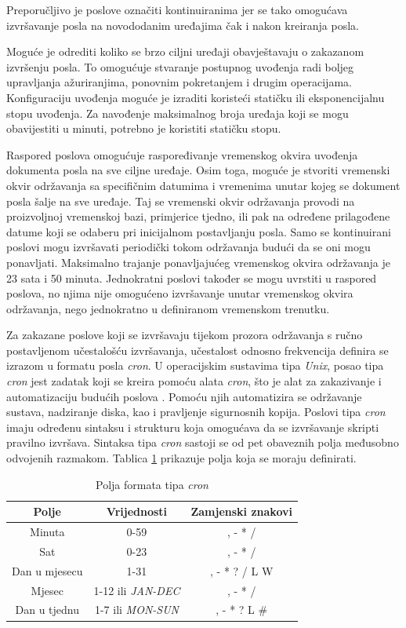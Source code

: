 Preporučljivo je poslove označiti kontinuiranima jer se tako omogućava izvršavanje posla na novododanim uređajima čak i nakon kreiranja posla. 

Moguće je odrediti koliko se brzo ciljni uređaji obavještavaju o zakazanom izvršenju posla. To omogućuje stvaranje postupnog uvođenja  radi boljeg upravljanja ažuriranjima, ponovnim pokretanjem i drugim operacijama. Konfiguraciju uvođenja moguće je izraditi koristeći statičku ili eksponencijalnu stopu uvođenja. Za navođenje maksimalnog broja uređaja koji se mogu obavijestiti u minuti, potrebno je koristiti statičku stopu. 

Raspored poslova omogućuje raspoređivanje vremenskog okvira uvođenja dokumenta posla na sve ciljne uređaje. Osim toga, moguće je stvoriti vremenski okvir održavanja sa specifičnim datumima i vremenima unutar kojeg se dokument posla šalje na sve uređaje. Taj se vremenski okvir održavanja provodi na proizvoljnoj vremenskoj bazi, primjerice tjedno, ili pak na određene prilagođene datume koji se odaberu pri inicijalnom postavljanju posla. Samo se kontinuirani poslovi mogu izvršavati periodički tokom održavanja budući da se oni mogu ponavljati. Maksimalno trajanje ponavljajućeg vremenskog okvira održavanja je 23 sata i 50 minuta. Jednokratni poslovi također se mogu uvrstiti u raspored poslova, no njima nije omogućeno izvršavanje unutar vremenskog okvira održavanja, nego jednokratno u definiranom vremenskom trenutku. 

Za zakazane poslove koji se izvršavaju tijekom prozora održavanja s ručno postavljenom učestalošću izvršavanja, učestalost odnosno frekvencija definira se izrazom u formatu posla \textit{cron}. U operacijskim sustavima tipa \textit{Unix}, posao tipa \textit{cron} jest zadatak koji se kreira pomoću alata \textit{cron}, što je alat za zakazivanje i automatizaciju budućih poslova \cite{cron}. Pomoću njih automatizira se održavanje sustava, nadziranje diska, kao i pravljenje sigurnosnih kopija. Poslovi tipa \textit{cron} imaju određenu sintaksu i strukturu koja omogućava da se izvršavanje skripti pravilno izvršava. Sintaksa tipa \textit{cron} sastoji se od pet obaveznih polja međusobno odvojenih razmakom. Tablica \ref{table:cron} prikazuje polja koja se moraju definirati. 

\begin{table}[ht!]
	\centering
	\caption{Polja formata tipa \textit{cron} \cite{aws_docs}}
	\begin{tabular}{|c| c| c|}
		\hline
		\rowcolor{lightblue}  
		\textbf{Polje} & \textbf{Vrijednosti} & \textbf{Zamjenski znakovi} \\ \hline
		Minuta & 0-59 & , - * / \\ \hline
		Sat & 0-23 & , - * / \\ \hline
		Dan u mjesecu & 1-31 & , - * ? / L W \\ \hline
		Mjesec & 1-12 ili \textit{JAN-DEC} & , - * / \\ \hline
		Dan u tjednu & 1-7 ili \textit{MON-SUN} & , - * ? L \# \\ \hline
	\end{tabular}
	\label{table:cron}
\end{table}

